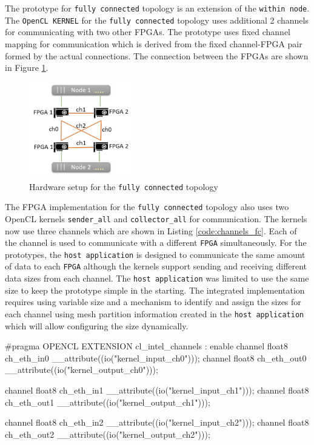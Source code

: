 The prototype for \texttt{fully connected} topology is an extension of the \texttt{within node}.
The \texttt{OpenCL KERNEL} for the \texttt{fully connected} topology uses additional 2 channels for communicating with
two other FPGAs. The prototype uses fixed channel mapping for communication which is derived
from the fixed channel-FPGA pair formed by the actual connections. The connection between
the FPGAs are shown in Figure \ref{fig:fc_topology}.

\begin{figure}[h]%
    \centering
    \includegraphics[width=0.4\textwidth]{images/fc_topology}
    \caption{Hardware setup for the \texttt{fully connected} topology}
    \label{fig:fc_topology}
\end{figure}

The FPGA implementation for the \texttt{fully connected} topology also uses two OpenCL kernels
\texttt{sender\_all} and \texttt{collector\_all} for communication. The kernels
now use three channels which are shown in Listing \ref{code:channels_fc}.
Each of the channel is used to communicate with a different \texttt{FPGA} simultaneously.
For the prototypes, the \texttt{host application} is designed to communicate the same amount of data
to each \texttt{FPGA} although the kernels support sending and receiving different data
sizes from each channel. The \texttt{host application} was limited to use the same size to keep the prototype
simple in the starting. The integrated implementation requires using variable size and
a mechanism to identify and assign the sizes for each channel using mesh partition
information created in the \texttt{host application} which will allow configuring the size dynamically.

\begin{CppCode} [caption=Channels used for \texttt{fully connected} topology, frame=tlrb, label=code:channels_fc, float]
#pragma OPENCL EXTENSION cl_intel_channels : enable
channel float8 ch_eth_in0 __attribute((io("kernel_input_ch0")));
channel float8 ch_eth_out0 __attribute((io("kernel_output_ch0")));

channel float8 ch_eth_in1 __attribute((io("kernel_input_ch1")));
channel float8 ch_eth_out1 __attribute((io("kernel_output_ch1")));

channel float8 ch_eth_in2 __attribute((io("kernel_input_ch2")));
channel float8 ch_eth_out2 __attribute((io("kernel_output_ch2")));
\end{CppCode}

